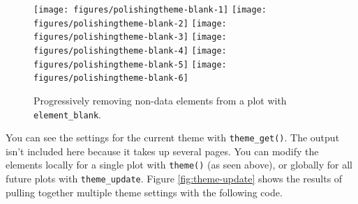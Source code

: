 \begin{Shaded}
\begin{Highlighting}[]
\NormalTok{() +}\StringTok{ }\NormalTok{(} \NormalTok{())}
\NormalTok{() +}\StringTok{ }\NormalTok{(} \NormalTok{())}
\NormalTok{() +}\StringTok{ }\NormalTok{(} \NormalTok{())}
\NormalTok{() +}\StringTok{ }
\StringTok{  }\NormalTok{(} \NormalTok{(), }
         \NormalTok{())}
\NormalTok{() +}\StringTok{ }\NormalTok{(} \NormalTok{())}
\end{Highlighting}
\end{Shaded}

\begin{figure}

{\centering \texttt{[image: figures/polishingtheme-blank-1]} \texttt{[image: figures/polishingtheme-blank-2]} \texttt{[image: figures/polishingtheme-blank-3]} \texttt{[image: figures/polishingtheme-blank-4]} \texttt{[image: figures/polishingtheme-blank-5]} \texttt{[image: figures/polishingtheme-blank-6]} 

}

\caption{Progressively removing non-data elements from a plot with \texttt{element\_blank}.\label{fig:theme-blank}}
\end{figure}

You can see the settings for the current theme with
\texttt{theme\_get()}. The output isn't included here because it takes
up several pages. You can modify the elements locally for a single plot
with \texttt{theme()} (as seen above), or globally for all future plots
with \texttt{theme\_update}. Figure \ref{fig:theme-update} shows the
results of pulling together multiple theme settings with the following
code.   

